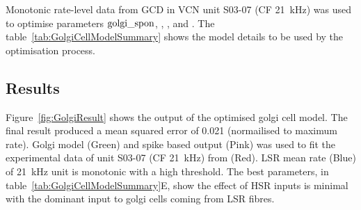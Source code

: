 \medskip{}

Monotonic rate-level data from GCD in VCN \citep{GhoshalKim:1996} unit
S03-07 (CF 21~kHz) was used to optimise parameters ${\rm
golgi\_spon}$, \wLSRGLG, \wHSRGLG, and \sANFGLG\@.  The table~\ref{tab:GolgiCellModelSummary}
shows the model details to be used by the optimisation process. 










\subsection{Results}

Figure~\ref{fig:GolgiResult} shows the output of the optimised golgi cell model.
The final result produced a mean squared error of 0.021 (normailised to maximum
rate). Golgi model (Green) and spike based output (Pink) was used to fit the
experimental data of unit S03-07 (CF 21~kHz) from \citep{GhoshalKim:1996} (Red).
LSR mean rate (Blue) of 21~kHz unit is monotonic with a high threshold.  The best parameters, in table~\ref{tab:GolgiCellModelSummary}E, show the effect of HSR inputs is minimal with the dominant input to golgi cells coming from LSR fibres.


